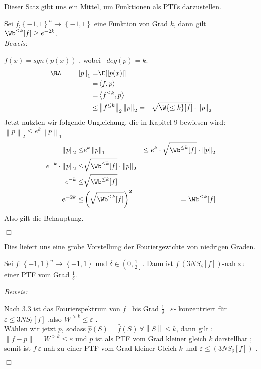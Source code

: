 \documentclass{article}
\newenvironment{proof}{
	\textit{Beweis: \\}
}{
	\begin{flushright}
		$\Box$ 
	\end{flushright}
}
\begin{document}
	Dieser Satz gibt uns ein Mittel, um Funktionen als PTFs darzustellen.
	
	\begin{satz}
		Sei $f_:\left\lbrace -1,1 \right\rbrace^{n} \to \left\lbrace -1, 1 \right\rbrace $ eine Funktion von Grad $k$, dann gilt $ \Wb^{\le k}[f] \geq e^{-2k} $.\\
		\begin{proof}
			$f(x)=sgn(p(x))$ , wobei \ $deg(p)=k$. 
			\begin{eqnarray*}
				\RA \qquad \left\lVert p \right\rVert_1 =&  \E[\left|p(x) \right|] &\\
				 =&\left\langle f,p \right\rangle &\\
				=& \left\langle f^{\leq k},p \right\rangle &\\
				 \leq &\left\lVert f^{\leq k} \right\rVert_2 \left\lVert p \right\rVert_2 = & \sqrt{\W{\leq k}[f]} \cdot \left\lVert p \right\rVert_2	 
			\end{eqnarray*}
			Jetzt nutzten wir folgende Ungleichung, die in Kapitel 9 \cite{booleananalysis} bewiesen wird: $\left\lVert p \right\rVert_2 \leq e^k \left\lVert p\right\rVert_1$ 			
			\begin{eqnarray*}
				 	\left\lVert p \right\rVert_2 \leq & e^k  	\left\lVert p\right\rVert_1 &\leq  e^k \cdot \sqrt{\Wb^{\leq k}[f]} \cdot \left\lVert p \right\rVert_2	\\
				       e^{-k} \cdot\left\lVert p \right\rVert_2 \leq & \sqrt{\Wb^{\leq k}[f]} \cdot \left\lVert p \right\rVert_2 & \\
				       e^{-k} \leq & \sqrt{\Wb^{\leq k}[f]} &\\
				     e^{-2k} \leq &\left( \sqrt{ \Wb^{\leq k}[f] }\right)^2&=\Wb^{\leq k}[f] 
			\end{eqnarray*}
			Also gilt die Behauptung.
		\end{proof}
	\end{satz}
	Dies liefert uns eine grobe Vorstellung der Fouriergewichte von niedrigen Graden.
	\begin{prop}
		Sei $f: {\left\lbrace -1,1 \right\rbrace}^n \to \left\lbrace -1,1 \right\rbrace $ und $ \delta \in \left( 0, \frac{1}{2} \right] $. Dann ist $f \ (3NS_\delta[f])$-nah zu einer PTF vom Grad $\frac{1}{\delta}$.

	\begin{proof}
		Nach 3.3 ist das Fourierspektrum von $f$ \ bis Grad $ \frac{1}{\delta} $ \ $\varepsilon$- konzentriert f\"ur $\varepsilon \leq 3NS_\delta [f]$ ,also $W^{>k} \leq \varepsilon$ .\\
		 W\"ahlen wir jetzt $p$, sodass $ \widehat{p}(S)=\widehat{f}(S) \ \forall \left\lVert S \right\rVert \leq k$, dann gilt : $\left\lVert f-p \right\rVert = W^{>k} \leq  \varepsilon$ und $p$ ist als PTF vom Grad kleiner gleich $k$ darstellbar ; somit ist $f \ \varepsilon$-nah zu einer PTF vom Grad kleiner Gleich $k$ und $ \varepsilon \leq (3NS_\delta[f]) $ .
	\end{proof}
		\end{prop}	
\end{document}

